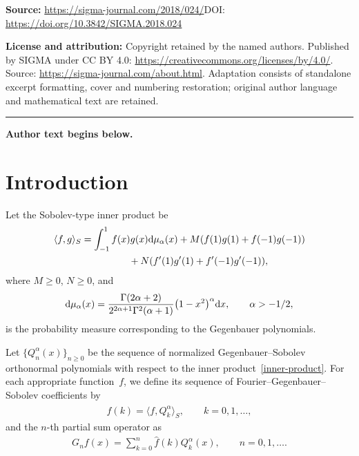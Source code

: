 \documentclass[11pt]{article}
\numberwithin{equation}{section}
\begin{document}
\noindent\textbf{Source:} \url{https://sigma-journal.com/2018/024/}\quad DOI: \url{https://doi.org/10.3842/SIGMA.2018.024}\par
\noindent\textbf{License and attribution:} Copyright retained by the named authors. Published by SIGMA under CC BY 4.0: \url{https://creativecommons.org/licenses/by/4.0/}. Source: \url{https://sigma-journal.com/about.html}. Adaptation consists of standalone excerpt formatting, cover and numbering restoration; original author language and mathematical text are retained.\par
\medskip\hrule\medskip\noindent\textbf{Author text begins below.}\par
\setcounter{section}{0}
\setcounter{subsection}{0}
\setcounter{subsubsection}{0}
\setcounter{thm}{0}
\setcounter{equation}{0}
\section{Introduction}

Let the Sobolev-type inner product be
\begin{gather}
\langle f,g \rangle_S=\int_{-1}^{1}f(x)g(x){\rm d}\mu_{\alpha}(x)+M(f(1)g(1)+f(-1)g(-1))\nonumber\\
\hphantom{\langle f,g \rangle_S=}{} +N(f'(1)g'(1)+f'(-1)g'(-1)),\label{inner-product}
\end{gather}
where $M\ge 0$, $N\ge 0$, and
\begin{gather*}
{\rm d}\mu_{\alpha}(x)=\frac{\Gamma(2\alpha+2)}{2^{2\alpha+1}\Gamma^2(\alpha+1)}\big(1-x^2\big)^{\alpha}{\rm d}x,\qquad \alpha>-1/2,
\end{gather*}
is the probability measure corresponding to the Gegenbauer polynomials.

Let $\{Q_n^{\alpha}(x)\}_{n\ge 0}$ be the sequence of normalized Gegenbauer--Sobolev orthonormal polynomials with respect to the inner product~\eqref{inner-product}. For each appropriate function~$f$, we define its sequence of Fourier--Gegenbauer--Sobolev coefficients by
\begin{gather*}
\widehat{f}(k)=\langle f, Q_k^{\alpha}\rangle_S, \qquad k=0,1,\dots,
\end{gather*}
and the $n$-th partial sum operator as
\begin{gather*}
G_nf(x)=\sum_{k=0}^n \widehat{f}(k) Q_k^{\alpha}(x), \qquad n=0,1,\dots.
\end{gather*}
\end{document}
